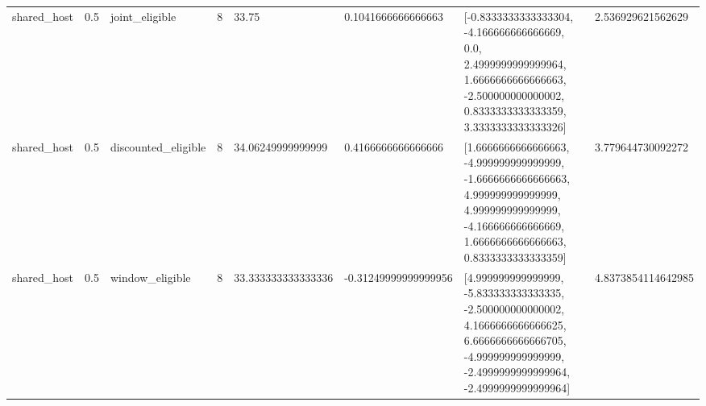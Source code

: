 \begin{tabular}{llllllll}
shared\_host & 0.5 & joint\_eligible & 8 & 33.75 & 0.1041666666666663 & [-0.8333333333333304, -4.166666666666669, 0.0, 2.4999999999999964, 1.6666666666666663, -2.500000000000002, 0.8333333333333359, 3.3333333333333326] & 2.536929621562629 \\
shared\_host & 0.5 & discounted\_eligible & 8 & 34.06249999999999 & 0.4166666666666666 & [1.6666666666666663, -4.999999999999999, -1.6666666666666663, 4.999999999999999, 4.999999999999999, -4.166666666666669, 1.6666666666666663, 0.8333333333333359] & 3.779644730092272 \\
shared\_host & 0.5 & window\_eligible & 8 & 33.333333333333336 & -0.31249999999999956 & [4.999999999999999, -5.833333333333335, -2.500000000000002, 4.1666666666666625, 6.6666666666666705, -4.999999999999999, -2.4999999999999964, -2.4999999999999964] & 4.8373854114642985 \\
\end{tabular}
